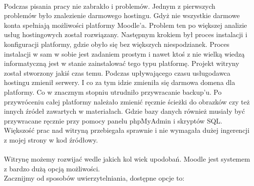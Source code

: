 \ \\
Podczas pisania pracy nie zabrakło i problemów. Jednym z pierwszych problemów było znalezienie darmowego hostingu. Gdyż nie wszystkie darmowe konta spełniają możliwości platformy Moodle'a. Problem ten po większej analizie usług hostingowych został rozwiązany. Następnym krokiem był proces instalacji i konfiguracji platformy, gdzie obyło się bez większych niespodzianek. Proces instalacji w sam w sobie jest zadaniem prostym i nawet ktoś z nie wielką wiedzą informatyczną jest w stanie zainstalować tego typu platformę. Projekt witryny został stworzony jakiś czas temu. Podczas upływającego czasu usługodawca hostingu zmienił serwery. I co za tym idzie zmieniła się darmowa domena dla platformy. Co w znacznym stopniu utrudniło przywracanie backup'u. Po przywróceniu całej platformy należało zmienić ręcznie ścieżki do obrazków czy też innych źródeł zawartych w materiałach. Gdzie bazy danych również musiały być przywracane ręcznie przy pomocy panelu phpMyAdmin i skryptów SQL. Większość prac nad witryną przebiegała sprawnie i nie wymagała dużej ingerencji z mojej strony w kod źródłowy. \\
\  \\
Witrynę możemy rozwijać wedle jakich kol wiek upodobań. Moodle jest systemem z bardzo dużą opcją możliwości. \\
Zacznijmy od sposobów uwierzytelniania, dostępne opcje to:
